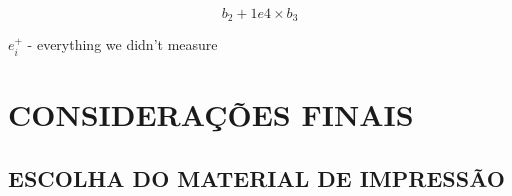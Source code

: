 \documentclass[12pt,openright,oneside,a4paper,chapter=TITLE,section=TITLE,subsection=Title,english,french,spanish,portugues,sumario=tradicional]{04-class-files/abntex2}
\begin{document}
\[b_2 + 1e4 \times b_3\]

\(e^+_i\) - everything we didn't measure


\chapter*[Conclusão]{CONSIDERAÇÕES FINAIS}

\lipsum[31-33]

\postextual


\printbibliography

\postextual


{\begin{apendicesenv}

\renewcommand{\thechapter}{\arabic{chapter}}

\chapter{ESCOLHA DO MATERIAL DE IMPRESSÃO}

\lipsum[30]

\end{apendicesenv}
}{}



\printbibliography
\end{document}
